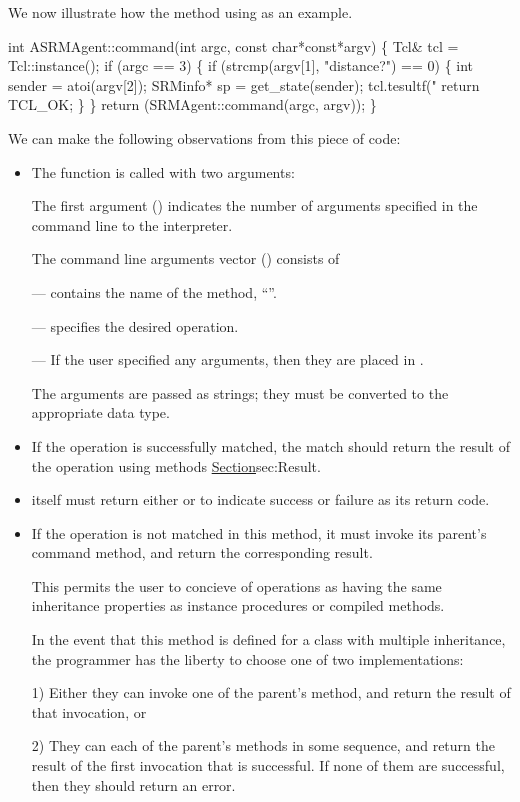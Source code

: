 We now illustrate how the  method using
 as an example.
\begin{program}
        int ASRMAgent::command(int argc, const char*const*argv) \{
                Tcl& tcl = Tcl::instance();
                if (argc == 3) \{
                        if (strcmp(argv[1], "distance?") == 0) \{
                                int sender = atoi(argv[2]);
                                SRMinfo* sp = get_state(sender);
                                tcl.tesultf("%
                                return TCL_OK;
                        \}
                \}
                return (SRMAgent::command(argc, argv));
        \}
\end{program}
We can make the following observations from this piece of code:
\begin{itemize}
\item The function is called with two arguments:
  
  The first argument () indicates
  the number of arguments specified in the command line to the interpreter.

  The command line arguments vector () consists of
  
  ---  contains the name of the method, ``''.

  ---  specifies the desired operation.

  --- If the user specified any arguments, then they are placed in
  .

  The arguments are passed as strings;
  they must be converted to the appropriate data type.
\item If the operation is successfully matched,
  the match should return the result of the operation
  using methods \href{described earlier}{Section}{sec:Result}.
\item {} itself must return either  or 
  to indicate success or failure as its return code.
\item If the operation is not matched in this method, it must
  invoke its parent's command method, and return the corresponding result.

  This permits the user to concieve of operations as having the same
  inheritance properties as instance procedures or compiled methods.

  In the event that this  method 
  is defined for a class with multiple inheritance,
  the programmer has the liberty to choose one of two implementations:

  1) Either they can invoke one of the parent's  method,
  and return the result of that invocation, or

  2) They can each of the parent's  methods in some sequence,
  and return the result of the first invocation that is successful.
  If none of them are successful, then they should return an error.
\end{itemize}
